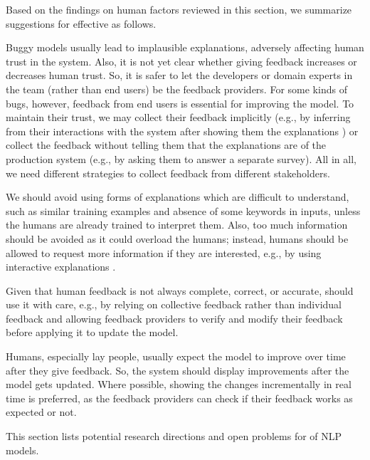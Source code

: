 Based on the findings on human factors reviewed in this section, we summarize suggestions for effective \EBHD as follows.

Buggy models usually lead to implausible explanations, adversely affecting human trust in the system.
Also, it is not yet clear whether giving feedback increases or decreases human trust.
So, it is safer to let the developers or domain experts in the team (rather than end users) be the feedback providers.
For some kinds of bugs, however, feedback from end users is essential for improving the model. 
To maintain their trust, we may collect their feedback implicitly (e.g., by inferring from their interactions with the system after showing them the explanations ) or collect the feedback without telling them that the explanations are of the production system (e.g., by asking them to answer a separate survey). 
All in all, we need different strategies to collect feedback from different stakeholders.

We should avoid using forms of explanations which are difficult to understand, such as similar training examples and absence of some keywords in inputs, unless the humans are already trained to interpret them.
Also, too much information should be avoided as it could overload the humans; instead, humans should be allowed to request more information if they are interested,
e.g., by using interactive explanations .

Given that human feedback is not always complete, correct, or accurate,
\EBHD should use it with care, e.g., by relying on collective feedback rather than individual feedback and allowing feedback providers to verify and modify their feedback before applying it to update the model.

Humans, especially lay people, usually expect the model to improve over time after they give 
feedback. So, the system should display improvements after the model gets updated.
Where possible, showing the changes incrementally 
in real time is preferred, as the feedback providers can check if their feedback works as expected or not.

\label{sec:open_problems}
This section lists potential research directions and open problems for \EBHD of NLP models.

